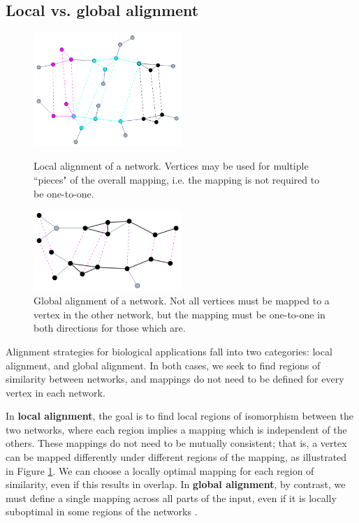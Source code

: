 \documentclass[12pt]{thesis}
\theoremstyle{plain}
\theoremstyle{definition}
\theoremstyle{remark}
\begin{document}
\subsection{Local vs. global alignment}

\renewcommand{\topfraction}{0.65}
\begin{figure}[!t]
\centering
\includegraphics[width=0.5\textwidth]{local_alignment.png}
\caption{Local alignment of a network. Vertices may be used for multiple ``pieces" of the overall mapping, i.e. the mapping is not required to be one-to-one.}

\includegraphics[width=0.5\textwidth]{global_alignment.png}
\caption{Global alignment of a network. Not all vertices must be mapped to a vertex in the other network, but the mapping must be one-to-one in both directions for those which are.}
\label{fig:alignment}
\end{figure}

Alignment strategies for biological applications fall into two categories: local alignment, and global alignment. In both cases, we seek to find regions of similarity between networks, and mappings do not need to be defined for every vertex in each network. 

In \textbf{local alignment}, the goal is to find local regions of isomorphism between the two networks, where each region implies a mapping which is independent of the others. These mappings do not need to be mutually consistent; that is, a vertex can be mapped differently under different regions of the mapping, as illustrated in Figure \ref{fig:alignment}. We can choose a locally optimal mapping for each region of similarity, even if this results in overlap. In \textbf{global alignment}, by contrast, we must define a single mapping across all parts of the input, even if it is locally suboptimal in some regions of the networks \cite{Singh_2007}. 
\end{document}
